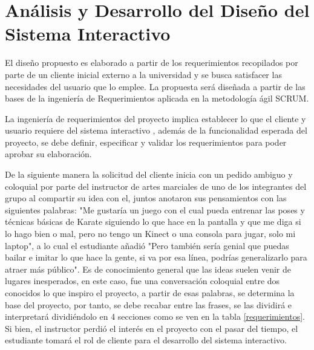 \chapter{Análisis y Desarrollo del Diseño del Sistema Interactivo}

El diseño propuesto es elaborado a partir de los requerimientos recopilados por parte de un cliente inicial externo a la universidad y se busca satisfacer las necesidades del usuario que lo emplee. La propuesta será diseñada a partir de las bases de la ingeniería de Requerimientos aplicada en la metodología ágil SCRUM.

La ingeniería de requerimientos del proyecto implica establecer lo que el cliente y usuario requiere del sistema interactivo \cite{scrumdiapo}, además de la funcionalidad esperada del proyecto, se debe definir, especificar y validar los requerimientos para poder aprobar su elaboración.

De la siguiente manera la solicitud del cliente inicia con un pedido ambiguo y coloquial por parte del instructor de artes marciales de uno de los integrantes del grupo al compartir su idea con el, juntos anotaron sus pensamientos con las siguientes palabras: "Me gustaría un juego con el cual pueda entrenar las poses y técnicas básicas de Karate siguiendo lo que hace en la pantalla y que me diga si lo hago bien o mal, pero no tengo un Kinect o una consola para jugar, solo mi laptop", a lo cual el estudiante añadió "Pero también sería genial que puedas bailar e imitar lo que hace la gente, si va por esa línea, podrías generalizarlo para atraer más público". Es de conocimiento general que las ideas suelen venir de lugares inesperados, en este caso, fue una conversación coloquial entre dos conocidos lo que inspiro el proyecto, a partir de esas palabras, se determina la base del proyecto, por tanto, se debe recabar entre las frases, se las dividirá e interpretará dividiéndolo en 4 secciones como se ven en la tabla \ref{requerimientos}. Si bien, el instructor perdió el interés en el proyecto con el pasar del tiempo, el estudiante tomará el rol de cliente para el desarrollo del sistema interactivo.


